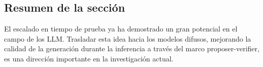 \subsection{Resumen de la sección}

El escalado en tiempo de prueba ya ha demostrado un gran potencial en el campo de los LLM. Trasladar esta idea hacia los modelos difusos, mejorando la calidad de la generación durante la inferencia a través del marco proposer-verifier, es una dirección importante en la investigación actual.



